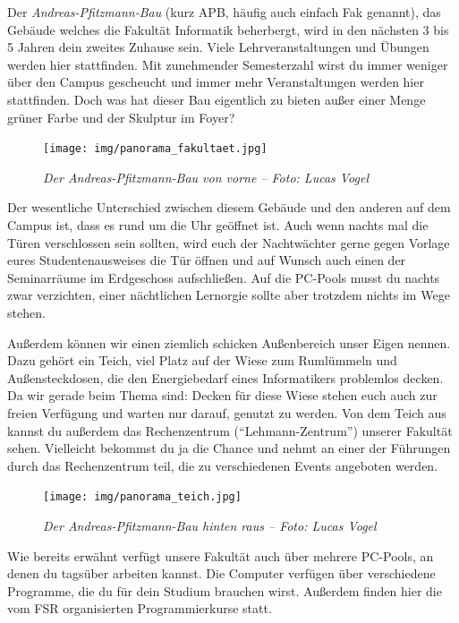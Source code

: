 
Der \emph{Andreas-Pfitzmann-Bau} (kurz APB, häufig auch einfach \glqq{}Fak\grqq{} genannt), das Gebäude welches die Fakultät Informatik beherbergt, wird in den nächsten 3 bis 5 Jahren dein zweites Zuhause sein.
Viele Lehrveranstaltungen und Übungen werden hier stattfinden. Mit zunehmender Semesterzahl wirst du immer weniger über den Campus gescheucht und immer mehr Veranstaltungen werden hier stattfinden.
Doch was hat dieser Bau eigentlich zu bieten außer einer Menge grüner Farbe und der Skulptur im Foyer?

\begin{figure}[h!]
\centering
\texttt{[image: img/panorama\_fakultaet.jpg]}
\caption*{\small \textit{Der Andreas-Pfitzmann-Bau von vorne -- Foto: Lucas Vogel}}
\end{figure}

Der wesentliche Unterschied zwischen diesem Gebäude und den anderen auf dem Campus ist, dass es rund um die Uhr geöffnet ist. Auch wenn nachts mal die Türen verschlossen sein sollten, wird euch der Nachtwächter gerne gegen Vorlage eures Studentenausweises die Tür öffnen und auf Wunsch auch einen der Seminarräume im Erdgeschoss aufschließen.
Auf die PC-Pools musst du nachts zwar verzichten, einer nächtlichen Lernorgie sollte aber trotzdem nichts im Wege stehen.

Außerdem können wir einen ziemlich schicken Außenbereich unser Eigen nennen. Dazu gehört ein Teich, viel Platz auf der Wiese zum Rumlümmeln und Außensteckdosen, die den Energiebedarf eines Informatikers problemlos decken. Da wir gerade beim Thema sind: Decken für diese Wiese stehen euch auch zur freien Verfügung und warten nur darauf, genutzt zu werden.
Von dem Teich aus kannst du außerdem das Rechenzentrum (\enquote{Lehmann-Zentrum}) unserer Fakultät sehen. Vielleicht bekommst du ja die Chance und nehmt an einer der Führungen durch das Rechenzentrum teil, die zu verschiedenen Events angeboten werden.


\pagebreak

\begin{figure}[t]
    \centering
    \texttt{[image: img/panorama\_teich.jpg]}
    \caption*{\small \textit{Der Andreas-Pfitzmann-Bau hinten raus -- Foto: Lucas Vogel}}
\end{figure}

Wie bereits erwähnt verfügt unsere Fakultät auch über mehrere PC-Pools, an denen du tagsüber arbeiten kannst. Die Computer verfügen über verschiedene Programme, die du für dein Studium brauchen wirst. Außerdem finden hier die vom FSR organisierten Programmierkurse statt.

